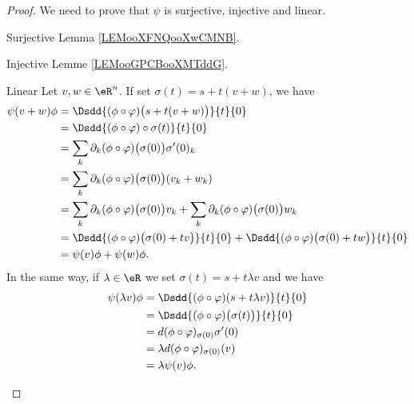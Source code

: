 \begin{proof}
    We need to prove that \( \psi\) is surjective, injective and linear.
    \begin{subproof}
    \item[Surjective] Lemma \ref{LEMooXFNQooXwCMNB}.
    \item[Injective] Lemme \ref{LEMooGPCBooXMTddG}.
    \item[Linear]
        Let \( v,w\in \eR^n\). If set \( \sigma(t)=s+t(v+w)\), we have
        \begin{subequations}
            \begin{align}
                \psi(v+w)\phi&=\Dsdd{ (\phi\circ \varphi)\big( s+t(v+w) \big) }{t}{0}\\
                &=\Dsdd{ (\phi\circ \varphi)\circ \sigma(t) }{t}{0}\\
                &=\sum_k\partial_k(\phi\circ\varphi)\big( \sigma(0) \big)\sigma'(0)_k\\
                &=\sum_k\partial_k(\phi\circ\varphi)\big( \sigma(0) \big)(v_k+w_k)\\
                &=\sum_k\partial_k(\phi\circ\varphi)\big( \sigma(0) \big)v_k+\sum_k\partial_k(\phi\circ\varphi)\big( \sigma(0) \big)w_k\\
                &=\Dsdd{ (\phi\circ\varphi)\big( \sigma(0)+tv \big) }{t}{0}+\Dsdd{ (\phi\circ\varphi)\big( \sigma(0)+tw \big) }{t}{0}\\
                &=\psi(v)\phi+\psi(w)\phi.
            \end{align}
        \end{subequations}
        In the same way, if \( \lambda\in \eR\) we set \( \sigma(t)=s+t\lambda v\) and we have
        \begin{subequations}
            \begin{align}
                \psi(\lambda v)\phi&=\Dsdd{ (\phi\circ\varphi)(s+t\lambda v) }{t}{0}\\
                &=\Dsdd{ (\phi\circ\varphi)\big( \sigma(t) \big) }{t}{0}\\
                &=d(\phi\circ\varphi)_{\sigma(0)}\sigma'(0)\\
                &=\lambda d(\phi\circ\varphi)_{\sigma(0)}(v)\\
                &=\lambda\psi(v)\phi.
            \end{align}
        \end{subequations}
    \end{subproof}
\end{proof}

